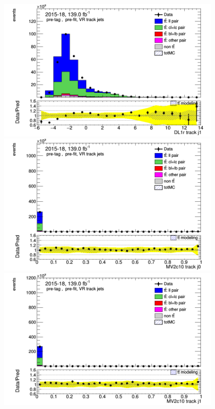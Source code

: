 \documentclass[letterpaper,12pt]{article}
\begin{document}
\begin{figure}[h]
\begin{minipage}[b]{.45\textwidth}
\end{minipage}\hfill
\begin{minipage}[b]{.45\textwidth}
\centering
\includegraphics[width=1\textwidth]{Oct_distributions/pretagNoRwDL1rwithhighpTVRJets_scaledall/DataMC__J1_DL1r.png}
\end{minipage}\hfill
\begin{minipage}[b]{.45\textwidth}
\centering
\includegraphics[width=1\textwidth]{Oct_distributions/pretagNoRwDL1rwithhighpTVRJets_scaledall/DataMC_J0_MV2c10.png}
\end{minipage}\hfill
\begin{minipage}[b]{.45\textwidth}
\centering
\includegraphics[width=1\textwidth]{Oct_distributions/pretagNoRwDL1rwithhighpTVRJets_scaledall/DataMC_J1_MV2c10.png}

\end{minipage}
\end{figure}
\end{document}
